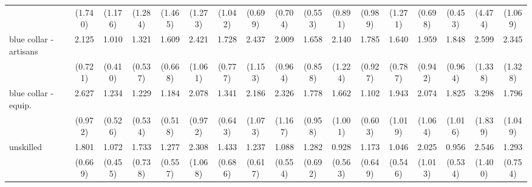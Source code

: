 {\begin{tabular}{l*{16}{c}}
                    &     (1.740)         &     (1.176)         &     (1.284)         &     (1.465)         &     (1.273)         &     (1.042)         &     (0.699)         &     (0.704)         &     (0.553)         &     (0.891)         &     (0.989)         &     (1.271)         &     (0.698)         &     (0.453)         &     (4.474)         &     (1.069)         \\
[1em]
blue collar - artisans&       2.125\sym{*}  &       1.010         &       1.321         &       1.609         &       2.421\sym{*}  &       1.728         &       2.437         &       2.009         &       1.658         &       2.140         &       1.785         &       1.640         &       1.959         &       1.848         &       2.599         &       2.345         \\
                    &     (0.721)         &     (0.410)         &     (0.537)         &     (0.668)         &     (1.061)         &     (0.777)         &     (1.153)         &     (0.964)         &     (0.858)         &     (1.224)         &     (0.927)         &     (0.787)         &     (0.942)         &     (0.964)         &     (1.338)         &     (1.328)         \\
[1em]
blue collar - equip.&       2.627\sym{**} &       1.234         &       1.229         &       1.184         &       2.078         &       1.341         &       2.186         &       2.326         &       1.778         &       1.662         &       1.102         &       1.943         &       2.074         &       1.825         &       3.298\sym{*}  &       1.796         \\
                    &     (0.972)         &     (0.526)         &     (0.534)         &     (0.518)         &     (0.972)         &     (0.643)         &     (1.073)         &     (1.167)         &     (0.958)         &     (1.001)         &     (0.603)         &     (1.019)         &     (1.064)         &     (1.016)         &     (1.839)         &     (1.049)         \\
[1em]
unskilled           &       1.801         &       1.072         &       1.733         &       1.277         &       2.308         &       1.433         &       1.237         &       1.088         &       1.282         &       0.928         &       1.173         &       1.046         &       2.025         &       0.956         &       2.546         &       1.293         \\
                    &     (0.669)         &     (0.455)         &     (0.738)         &     (0.557)         &     (1.068)         &     (0.686)         &     (0.617)         &     (0.554)         &     (0.692)         &     (0.563)         &     (0.649)         &     (0.546)         &     (1.013)         &     (0.534)         &     (1.400)         &     (0.754)         \\

\end{tabular}}
